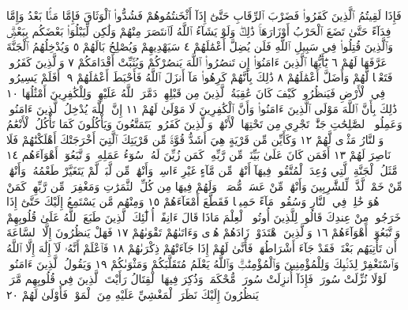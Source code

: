 فَإِذَا لَقِيتُمُ ٱلَّذِينَ كَفَرُوا۟ فَضَرْبَ ٱلرِّقَابِ حَتَّىٰٓ إِذَآ أَثْخَنتُمُوهُمْ فَشُدُّوا۟ ٱلْوَثَاقَ فَإِمَّا
مَنَّۢا بَعْدُ وَإِمَّا فِدَآءً حَتَّىٰ تَضَعَ ٱلْحَرْبُ أَوْزَارَهَاۚ ذَٰلِكَۖ وَلَوْ يَشَآءُ ٱللَّهُ لَٱنتَصَرَ
مِنْهُمْ وَلَٰكِن لِّيَبْلُوَا۟ بَعْضَكُم بِبَعْضࣲۗ وَٱلَّذِينَ قُتِلُوا۟ فِي سَبِيلِ ٱللَّهِ فَلَن يُضِلَّ
أَعْمَٰلَهُمْ ٤ سَيَهْدِيهِمْ وَيُصْلِحُ بَالَهُمْ ٥ وَيُدْخِلُهُمُ ٱلْجَنَّةَ عَرَّفَهَا لَهُمْ ٦
يَٰٓأَيُّهَا ٱلَّذِينَ ءَامَنُوٓا۟ إِن تَنصُرُوا۟ ٱللَّهَ يَنصُرْكُمْ وَيُثَبِّتْ أَقْدَامَكُمْ ٧
وَٱلَّذِينَ كَفَرُوا۟ فَتَعْسࣰا لَّهُمْ وَأَضَلَّ أَعْمَٰلَهُمْ ٨ ذَٰلِكَ بِأَنَّهُمْ كَرِهُوا۟
مَآ أَنزَلَ ٱللَّهُ فَأَحْبَطَ أَعْمَٰلَهُمْ ٩۞ أَفَلَمْ يَسِيرُوا۟ فِي ٱلْأَرْضِ فَيَنظُرُوا۟
كَيْفَ كَانَ عَٰقِبَةُ ٱلَّذِينَ مِن قَبْلِهِمْۖ دَمَّرَ ٱللَّهُ عَلَيْهِمْۖ وَلِلْكَٰفِرِينَ أَمْثَٰلُهَا ١٠
ذَٰلِكَ بِأَنَّ ٱللَّهَ مَوْلَى ٱلَّذِينَ ءَامَنُوا۟ وَأَنَّ ٱلْكَٰفِرِينَ لَا مَوْلَىٰ لَهُمْ ١١
إِنَّ ٱللَّهَ يُدْخِلُ ٱلَّذِينَ ءَامَنُوا۟ وَعَمِلُوا۟ ٱلصَّٰلِحَٰتِ جَنَّٰتࣲ تَجْرِي مِن
تَحْتِهَا ٱلْأَنْهَٰرُۖ وَٱلَّذِينَ كَفَرُوا۟ يَتَمَتَّعُونَ وَيَأْكُلُونَ كَمَا تَأْكُلُ ٱلْأَنْعَٰمُ
وَٱلنَّارُ مَثْوࣰى لَّهُمْ ١٢ وَكَأَيِّن مِّن قَرْيَةٍ هِيَ أَشَدُّ قُوَّةࣰ مِّن قَرْيَتِكَ
ٱلَّتِيٓ أَخْرَجَتْكَ أَهْلَكْنَٰهُمْ فَلَا نَاصِرَ لَهُمْ ١٣ أَفَمَن كَانَ عَلَىٰ بَيِّنَةࣲ مِّن
رَّبِّهِۦ كَمَن زُيِّنَ لَهُۥ سُوٓءُ عَمَلِهِۦ وَٱتَّبَعُوٓا۟ أَهْوَآءَهُم ١٤ مَّثَلُ ٱلْجَنَّةِ ٱلَّتِي
وُعِدَ ٱلْمُتَّقُونَۖ فِيهَآ أَنْهَٰرࣱ مِّن مَّآءٍ غَيْرِ ءَاسِنࣲ وَأَنْهَٰرࣱ مِّن لَّبَنࣲ لَّمْ يَتَغَيَّرْ
طَعْمُهُۥ وَأَنْهَٰرࣱ مِّنْ خَمْرࣲ لَّذَّةࣲ لِّلشَّٰرِبِينَ وَأَنْهَٰرࣱ مِّنْ عَسَلࣲ مُّصَفࣰّىۖ وَلَهُمْ
فِيهَا مِن كُلِّ ٱلثَّمَرَٰتِ وَمَغْفِرَةࣱ مِّن رَّبِّهِمْۖ كَمَنْ هُوَ خَٰلِدࣱ فِي ٱلنَّارِ وَسُقُوا۟
مَآءً حَمِيمࣰا فَقَطَّعَ أَمْعَآءَهُمْ ١٥ وَمِنْهُم مَّن يَسْتَمِعُ إِلَيْكَ حَتَّىٰٓ إِذَا
خَرَجُوا۟ مِنْ عِندِكَ قَالُوا۟ لِلَّذِينَ أُوتُوا۟ ٱلْعِلْمَ مَاذَا قَالَ ءَانِفًاۚ أُو۟لَٰٓئِكَ
ٱلَّذِينَ طَبَعَ ٱللَّهُ عَلَىٰ قُلُوبِهِمْ وَٱتَّبَعُوٓا۟ أَهْوَآءَهُمْ ١٦ وَٱلَّذِينَ ٱهْتَدَوْا۟
زَادَهُمْ هُدࣰى وَءَاتَىٰهُمْ تَقْوَىٰهُمْ ١٧ فَهَلْ يَنظُرُونَ إِلَّا ٱلسَّاعَةَ
أَن تَأْتِيَهُم بَغْتَةࣰۖ فَقَدْ جَآءَ أَشْرَاطُهَاۚ فَأَنَّىٰ لَهُمْ إِذَا جَآءَتْهُمْ
ذِكْرَىٰهُمْ ١٨ فَٱعْلَمْ أَنَّهُۥ لَآ إِلَٰهَ إِلَّا ٱللَّهُ وَٱسْتَغْفِرْ لِذَنۢبِكَ
وَلِلْمُؤْمِنِينَ وَٱلْمُؤْمِنَٰتِۗ وَٱللَّهُ يَعْلَمُ مُتَقَلَّبَكُمْ وَمَثْوَىٰكُمْ ١٩
وَيَقُولُ ٱلَّذِينَ ءَامَنُوا۟ لَوْلَا نُزِّلَتْ سُورَةࣱۖ فَإِذَآ أُنزِلَتْ سُورَةࣱ
مُّحْكَمَةࣱ وَذُكِرَ فِيهَا ٱلْقِتَالُ رَأَيْتَ ٱلَّذِينَ فِي قُلُوبِهِم مَّرَضࣱ
يَنظُرُونَ إِلَيْكَ نَظَرَ ٱلْمَغْشِيِّ عَلَيْهِ مِنَ ٱلْمَوْتِۖ فَأَوْلَىٰ لَهُمْ ٢٠
